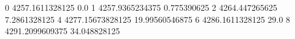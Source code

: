 0 4257.1611328125 0.0
1 4257.9365234375 0.775390625
2 4264.447265625 7.2861328125
4 4277.15673828125 19.99560546875
6 4286.1611328125 29.0
8 4291.2099609375 34.048828125
